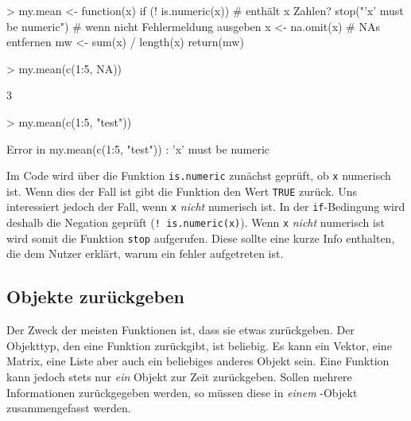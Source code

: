\documentclass[12pt, a4paper,twoside,openany,x11names,svgnames]{memoir}
\begin{document}
\begin{Schunk}
\begin{Sinput}
> my.mean <- function(x){
   if (! is.numeric(x))              # enthält x Zahlen?
     stop("'x' must be numeric")     # wenn nicht Fehlermeldung ausgeben
   x <- na.omit(x)                   # NAs entfernen
   mw <- sum(x) / length(x)
   return(mw)
 }
\end{Sinput}
\end{Schunk}
\vspace*{-5mm}
\begin{Schunk}
\begin{Sinput}
> my.mean(c(1:5, NA))         
\end{Sinput}
\begin{Soutput}
[1] 3
\end{Soutput}
\end{Schunk}
\vspace*{-5mm}
\begin{Schunk}
\begin{Sinput}
> my.mean(c(1:5, "test"))     
\end{Sinput}
\end{Schunk}
\vspace*{-8mm}
\begin{Schunk}
\begin{Soutput}
Error in my.mean(c(1:5, "test")) : 'x' must be numeric
\end{Soutput}
\end{Schunk}

Im Code wird über die Funktion \texttt{is.numeric} zunächst geprüft, ob \texttt{x} numerisch ist. Wenn dies der Fall ist gibt die Funktion den Wert \texttt{TRUE} zurück. Uns interessiert jedoch der Fall, wenn \texttt{x} \emph{nicht} numerisch ist. In der \texttt{if}-Bedingung wird deshalb die Negation geprüft (\texttt{! is.numeric(x)}). Wenn \texttt{x} \emph{nicht} numerisch ist wird somit die Funktion \texttt{stop} aufgerufen. Diese sollte eine kurze Info enthalten, die dem Nutzer erklärt, warum ein fehler aufgetreten ist. 


\subsection{Objekte zurückgeben}

Der Zweck der meisten Funktionen ist, dass sie etwas zurückgeben. Der Objekttyp, den eine Funktion zurückgibt, ist beliebig. Es kann ein Vektor, eine Matrix, eine Liste aber auch ein beliebiges anderes Objekt sein. Eine Funktion kann jedoch stets nur \emph{ein} Objekt zur Zeit zurückgeben. Sollen mehrere Informationen zurückgegeben werden, so müssen diese in \emph{einem} \R{}-Objekt zusammengefasst werden.
\end{document}
